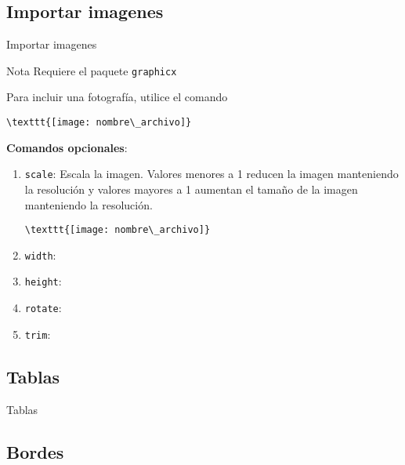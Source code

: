 \documentclass[../slides.tex]{subfiles}
\begin{document}
    
    \begin{frame}
        \tableofcontents[sections=\value{section}]
    \end{frame}

    \subsection{Importar imagenes}
    \begin{frame}[fragile]{Importar imagenes}
        \begin{block}{Nota}
            Requiere el paquete \texttt{graphicx}
        \end{block}

        Para incluir una fotografía, utilice el comando 
        \begin{verbatim}
\texttt{[image: nombre\_archivo]}
        \end{verbatim}
        \textbf{Comandos opcionales}:
            \begin{enumerate}
                \item \texttt{scale}: Escala la imagen. Valores menores a 1 reducen la imagen manteniendo la resolución y valores mayores a 1 aumentan el tamaño de la imagen manteniendo la resolución.
        \begin{verbatim}
\texttt{[image: nombre\_archivo]}
        \end{verbatim}
                \item \texttt{width}:
                \item \texttt{height}:
                \item \texttt{rotate}:
                \item \texttt{trim}:
            \end{enumerate}
        
    \end{frame}

    \subsection{Tablas}
    \begin{frame}{Tablas}
        
    \end{frame}

    \subsection{Bordes}
    
\end{document}
